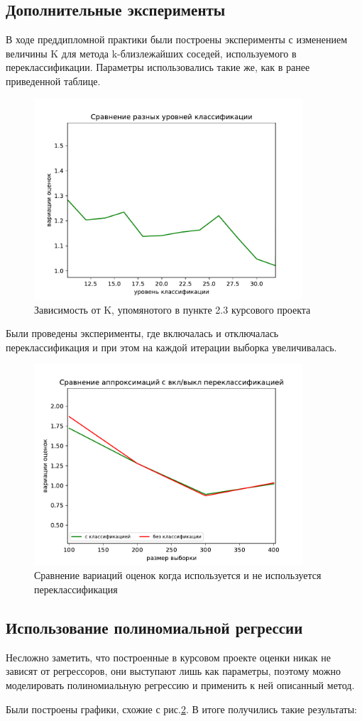 \newpage
\subsection{Дополнительные эксперименты}
В ходе преддипломной практики были построены эксперименты с изменением величины K для метода k-близлежайших соседей, используемого в переклассификации. Параметры использовались такие же, как в ранее приведенной таблице.
\begin{figure}[h!]
    \centering
    \includegraphics[width=100mm]{../images/different_recl_level.pdf}
    \caption{Зависимость от K, упомянотого в пункте 2.3 курсового проекта\label{overflow}}
    \label{pic1}
\end{figure}

Были проведены эксперименты, где включалась и отключалась переклассификация и при этом на каждой итерации выборка увеличивалась. 
\begin{figure}[h!]
    \centering
    \includegraphics[width=100mm]{../images/on_off_recl.pdf}
    \caption{Сравнение вариаций оценок когда используется и не используется переклассификация\label{overflow}}
    \label{pic2}
\end{figure}

\newpage

\subsection{Использование полиномиальной регрессии}
Несложно заметить, что построенные в курсовом проекте оценки никак не зависят от регрессоров, они выступают лишь как параметры, поэтому можно моделировать полиномиальную регрессию и применить к ней описанный метод.

Были построены графики, схожие с рис.\ref{pic2}. В итоге получились такие результаты: